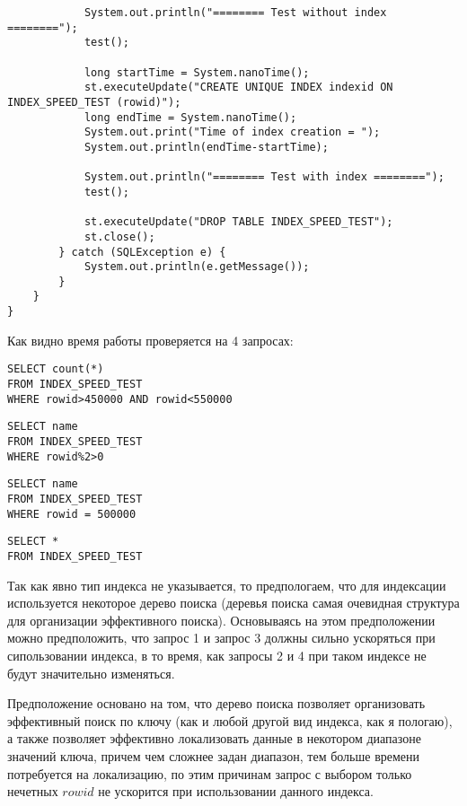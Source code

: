 \documentclass[a4paper,12pt]{article}
\begin{document}
\begin{lstlisting}
			System.out.println("======== Test without index ========");
			test();

			long startTime = System.nanoTime();
			st.executeUpdate("CREATE UNIQUE INDEX indexid ON INDEX_SPEED_TEST (rowid)");
			long endTime = System.nanoTime();
			System.out.print("Time of index creation = ");
			System.out.println(endTime-startTime);

			System.out.println("======== Test with index ========");
			test();

			st.executeUpdate("DROP TABLE INDEX_SPEED_TEST");
			st.close();
		} catch (SQLException e) {
			System.out.println(e.getMessage());
		}
	}
}
\end{lstlisting}

Как видно время работы проверяется на 4 запросах:

\begin{lstlisting}
SELECT count(*) 
FROM INDEX_SPEED_TEST 
WHERE rowid>450000 AND rowid<550000
\end{lstlisting}

\begin{lstlisting}
SELECT name 
FROM INDEX_SPEED_TEST 
WHERE rowid%2>0
\end{lstlisting}

\begin{lstlisting}
SELECT name 
FROM INDEX_SPEED_TEST 
WHERE rowid = 500000
\end{lstlisting}

\begin{lstlisting}
SELECT * 
FROM INDEX_SPEED_TEST
\end{lstlisting}

Так как явно тип индекса не указывается, то предпологаем, что для индексации используется некоторое дерево поиска (деревья поиска
самая очевидная структура для организации эффективного поиска).
Основываясь на этом предположении можно предположить, что запрос 1 и запрос 3 должны сильно ускоряться при сипользовании индекса,
в то время, как запросы 2 и 4 при таком индексе не будут значительно изменяться.

Предположение основано на том, что дерево поиска позволяет организовать эффективный поиск по ключу (как и любой другой вид индекса,
как я пологаю), а также позволяет эффективно локализовать данные в некотором диапазоне значений ключа, причем чем сложнее задан
диапазон, тем больше времени потребуется на локализацию, по этим причинам запрос с выбором только нечетных $rowid$ не ускорится при
использовании данного индекса.
\end{document}
